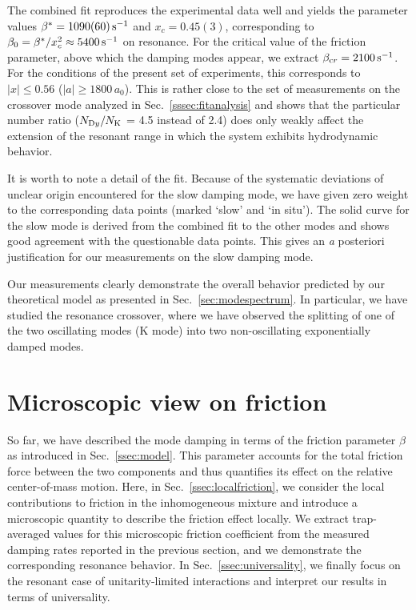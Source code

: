 The combined fit reproduces the experimental data well and yields the parameter values $\beta^* = 1090(60)\,{\textrm s}^{-1}$ and $x_c = 0.45(3)$, corresponding to $\beta_0 = \beta^*/x_c^2 \approx 5400\,{\textrm s}^{-1}$ on resonance.
For the critical value of the friction parameter, above which the damping modes appear, we extract $\beta_{\textrm cr} = 2100\,{\textrm s}^{-1}$. For the conditions of the present set of experiments, this corresponds to $|x| \le 0.56$ ($|a| \ge 1800\,a_0$). This is {rather} close to the set of measurements on the crossover mode analyzed in Sec.~\ref{sssec:fitanalysis}
{and shows that the particular number ratio ($N_{\textrm Dy}/N_{\textrm K}$ = 4.5 instead of 2.4) does only weakly affect the extension of the resonant range in which the system exhibits hydrodynamic behavior.}

It is worth to note a detail of the fit. Because of the systematic deviations of unclear origin encountered for the slow damping mode, we have given zero weight to the corresponding data points (marked `slow' and `in situ'). The solid curve for the slow mode is derived from the combined fit to the other modes and shows good agreement with the questionable data points. This gives an {\textit a posteriori} justification for our measurements on the slow damping mode.

Our measurements clearly demonstrate the overall behavior predicted by our theoretical model as presented in Sec.~\ref{sec:modespectrum}. In particular, we have studied the resonance crossover, where we have observed the splitting of one of the two oscillating modes (K mode) into two non-oscillating exponentially damped modes.

\section{Microscopic view on friction} 
\label{sec:microfriction}

{
So far, we have described the mode damping in terms of the friction parameter $\beta$ as introduced in Sec.~\ref{ssec:model}.  
This parameter accounts for the total friction force between the two components and thus quantifies its effect on the relative center-of-mass motion. Here, in Sec.~\ref{ssec:localfriction}, we consider the local contributions to friction in the inhomogeneous mixture and introduce a microscopic quantity to describe the friction effect locally. We extract trap-averaged values for this microscopic friction coefficient from the measured damping rates reported in the previous section, and we demonstrate the corresponding resonance behavior. In Sec.~\ref{ssec:universality}, we finally focus on the resonant case of unitarity-limited interactions and interpret our results in terms of universality.
}

